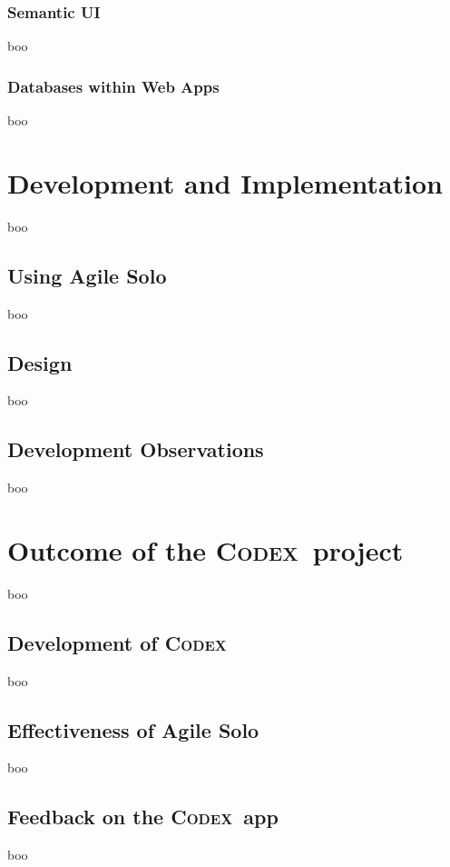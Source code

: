\documentclass[final]{cmpreport}
\newcommand{\Codex}{\textsc{Codex}}
\begin{document}
			\subsubsection{Semantic UI} \label{sec:semantic-ui}
			boo
			
			\subsubsection{Databases within Web Apps} \label{sec:databases}
			boo
			
	\section{Development and Implementation} \label{sec:dev-and-imp}
	boo
	
		\subsection{Using Agile Solo} \label{sec:use-agile-solo}
		boo
			
		\subsection{Design} \label{sec:design}
		boo
		
		\subsection{Development Observations} \label{sec:dev-obs}
		boo
		
	\section{Outcome of the \Codex \ project} \label{sec:outcomes}
	boo
	
		\subsection{Development of \Codex} \label{sec:codex-development}
		boo
			
		\subsection{Effectiveness of Agile Solo} \label{sec:agile-solo-effect}
		boo	
		
		\subsection{Feedback on the \Codex \ app} \label{sec:feedback}
		boo
		
\end{document}
